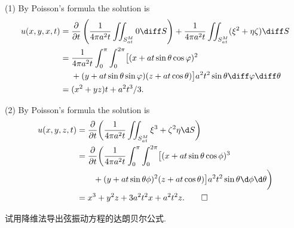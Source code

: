 \begin{solve}
  (1) By Poisson's formula the solution is
  \begin{align*}
    u(x,y,x,t)
    ={} & \frac{\partial}{\partial t}\left(\frac{1}{4\pi a^2t}\iint_{S_{at}^M}0\diff S\right)
          + \frac{1}{4\pi a^2t}\iint_{S_{at}^M}(\xi^2+\eta\zeta)\diff S \\
    ={} & \frac{1}{4\pi a^2t}\int_0^{\pi}\int_0^{2\pi} \bigl[(x+at\sin\theta\cos\varphi)^2 \\
        & + (y+at\sin\theta\sin\varphi)(z+at\cos\theta) \bigr]
          a^2t^2\sin\theta\diff\varphi\diff\theta \\
    ={} & (x^2+	yz)t + a^2t^3/3.
  \end{align*}

  (2) By Poisson's formula the solution is
  \begin{align*}
    u(x,y,z,t)
    & = \frac{\partial}{\partial t} \biggl(\frac{1}{4\pi a^2 t}\iint_{S_{at}^M} \xi^3
        + \zeta^2\eta \d S\biggr) \\
    & = \frac{\partial}{\partial t} \biggl(\frac{1}{4\pi a^2 t} \int_0^\pi \int_0^{2\pi}
        \bigl[ (x+at\sin\theta\cos\phi)^3 \\
    & \qquad + (y+at\sin\theta\phi)^2(z+at\cos\theta) \bigr] 
        a^2t^2\sin\theta \d \phi \d \theta\biggr) \\
    & = x^3 + y^2z + 3a^2t^2x + a^2t^2z. \qedhere
  \end{align*}
\end{solve}


\begin{exercise}
  试用降维法导出弦振动方程的达朗贝尔公式.
\end{exercise}

